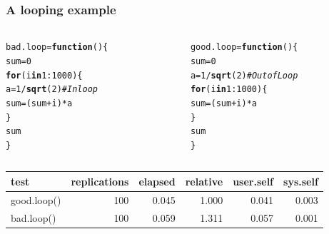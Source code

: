 \documentclass{beamer}\usepackage[]{graphicx}\usepackage[]{color}
\makeatletter
\newcommand{\hlnum}[1]{\textcolor[rgb]{0.686,0.059,0.569}{#1}}%
\newcommand{\hlcom}[1]{\textcolor[rgb]{0.678,0.584,0.686}{\textit{#1}}}%
\newcommand{\hlopt}[1]{\textcolor[rgb]{0,0,0}{#1}}%
\newcommand{\hlstd}[1]{\textcolor[rgb]{0.345,0.345,0.345}{#1}}%
\newcommand{\hlkwa}[1]{\textcolor[rgb]{0.161,0.373,0.58}{\textbf{#1}}}%
\newcommand{\hlkwb}[1]{\textcolor[rgb]{0.69,0.353,0.396}{#1}}%
\newcommand{\hlkwd}[1]{\textcolor[rgb]{0.737,0.353,0.396}{\textbf{#1}}}%
\newenvironment{kframe}{%
 \def\at@end@of@kframe{}%
 \ifinner\ifhmode%
  \def\at@end@of@kframe{\end{minipage}}%
  \begin{minipage}{\columnwidth}%
 \fi\fi%
 \def\FrameCommand##1{\hskip\@totalleftmargin \hskip-\fboxsep
 \colorbox{shadecolor}{##1}\hskip-\fboxsep
     \hskip-\linewidth \hskip-\@totalleftmargin \hskip\columnwidth}%
 \MakeFramed {\advance\hsize-\width
   \@totalleftmargin\z@ \linewidth\hsize
   \@setminipage}}%
 {\par\unskip\endMakeFramed%
 \at@end@of@kframe}
\newenvironment{knitrout}{}{} %
\makeatother
\begin{document}
\begin{frame}[fragile]
\frametitle{A looping example}
  \begin{columns}
    \begin{column}{.5\linewidth}
\begin{knitrout}
\color{fgcolor}\begin{kframe}
\begin{alltt}
\hlstd{bad.loop} \hlkwb{=} \hlkwa{function}\hlstd{()\{}
  \hlstd{sum} \hlkwb{=} \hlnum{0}
  \hlkwa{for}\hlstd{(i} \hlkwa{in} \hlnum{1}\hlopt{:}\hlnum{1000}\hlstd{)\{}
    \hlstd{a} \hlkwb{=} \hlnum{1}\hlopt{/}\hlkwd{sqrt}\hlstd{(}\hlnum{2}\hlstd{)} \hlcom{# In loop}
    \hlstd{sum} \hlkwb{=} \hlstd{(sum}\hlopt{+}\hlstd{i)}\hlopt{*}\hlstd{a}
  \hlstd{\}}
  \hlstd{sum}
\hlstd{\}}
\end{alltt}
\end{kframe}
\end{knitrout}
    \end{column}
    \begin{column}{.5\linewidth}
\begin{knitrout}
\color{fgcolor}\begin{kframe}
\begin{alltt}
\hlstd{good.loop} \hlkwb{=} \hlkwa{function}\hlstd{()\{}
  \hlstd{sum} \hlkwb{=} \hlnum{0}
  \hlstd{a} \hlkwb{=} \hlnum{1}\hlopt{/}\hlkwd{sqrt}\hlstd{(}\hlnum{2}\hlstd{)} \hlcom{# Out of Loop}
  \hlkwa{for}\hlstd{(i} \hlkwa{in} \hlnum{1}\hlopt{:}\hlnum{1000}\hlstd{)\{}
    \hlstd{sum} \hlkwb{=} \hlstd{(sum}\hlopt{+}\hlstd{i)}\hlopt{*}\hlstd{a}
  \hlstd{\}}
  \hlstd{sum}
\hlstd{\}}
\end{alltt}
\end{kframe}
\end{knitrout}
    \end{column}
  \end{columns}

\begin{center}
\begin{knitrout}
\color{fgcolor}
\begin{tabular}{l|r|r|r|r|r}
\hline
test & replications & elapsed & relative & user.self & sys.self\\
\hline
good.loop() & 100 & 0.045 & 1.000 & 0.041 & 0.003\\
\hline
bad.loop() & 100 & 0.059 & 1.311 & 0.057 & 0.001\\
\hline
\end{tabular}


\end{knitrout}
\end{center}
\end{frame}
\end{document}
